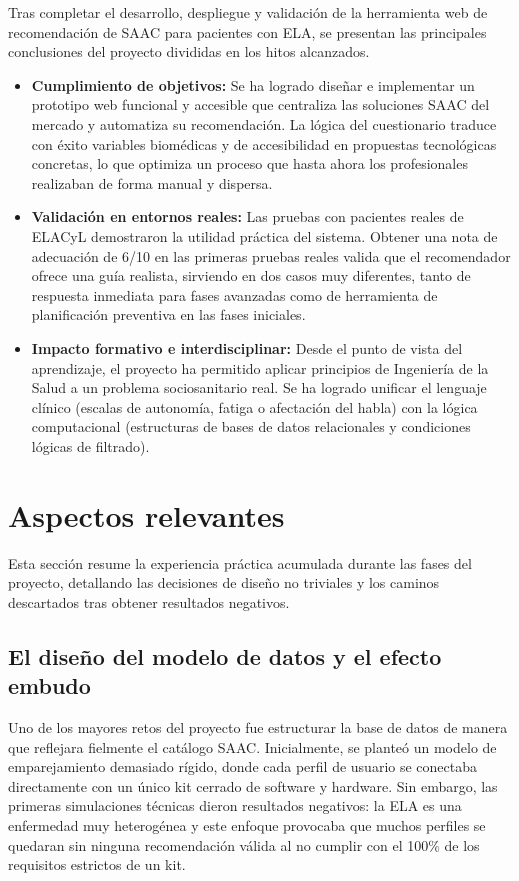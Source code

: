 Tras completar el desarrollo, despliegue y validación de la herramienta web de recomendación de SAAC para pacientes con ELA, se presentan las principales conclusiones del proyecto divididas en los hitos alcanzados.

\begin{itemize}
    	\item \textbf{Cumplimiento de objetivos:} Se ha logrado diseñar e implementar un prototipo web funcional y accesible que centraliza las soluciones SAAC del mercado y automatiza su recomendación. La lógica del cuestionario traduce con éxito variables biomédicas y de 				accesibilidad en propuestas tecnológicas concretas, lo que optimiza un proceso que hasta ahora los profesionales realizaban de forma manual y dispersa.
    	\item \textbf{Validación en entornos reales:} Las pruebas con pacientes reales de ELACyL demostraron la utilidad práctica del sistema. Obtener una nota de adecuación de 6/10 en las primeras pruebas reales valida que el recomendador ofrece una guía realista, sirviendo en dos casos 			muy diferentes, tanto de respuesta inmediata para fases avanzadas como de herramienta de planificación preventiva en las fases iniciales.
    	\item \textbf{Impacto formativo e interdisciplinar:} Desde el punto de vista del aprendizaje, el proyecto ha permitido aplicar principios de Ingeniería de la Salud a un problema sociosanitario real. Se ha logrado unificar el lenguaje clínico (escalas de autonomía, fatiga o afectación del 		habla) con la lógica computacional (estructuras de bases de datos relacionales y condiciones lógicas de filtrado).
\end{itemize}

\section{Aspectos relevantes}
Esta sección resume la experiencia práctica acumulada durante las fases del proyecto, detallando las decisiones de diseño no triviales y los caminos descartados tras obtener resultados negativos.

\subsection{El diseño del modelo de datos y el efecto embudo}
Uno de los mayores retos del proyecto fue estructurar la base de datos de manera que reflejara fielmente el catálogo SAAC. Inicialmente, se planteó un modelo de emparejamiento demasiado rígido, donde cada perfil de usuario se conectaba directamente con un único kit cerrado de software y hardware. Sin embargo, las primeras simulaciones técnicas dieron resultados negativos: la ELA es una enfermedad muy heterogénea y este enfoque provocaba que muchos perfiles se quedaran sin ninguna recomendación válida al no cumplir con el 100\% de los requisitos estrictos de un kit.

